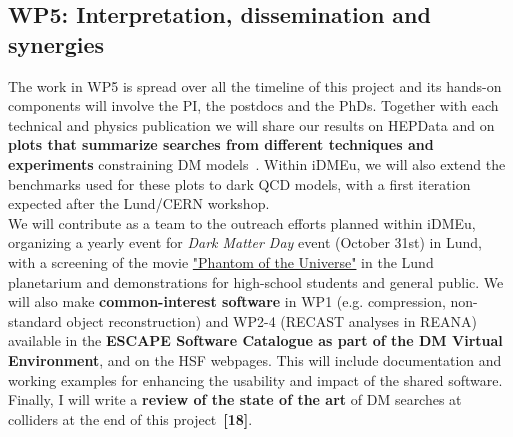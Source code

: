 \subsection{WP5: Interpretation, dissemination and synergies}

The work in WP5 is spread over all the timeline of this project and its hands-on components will involve the PI, the postdocs and the PhDs.
Together with each technical and physics publication we will share our results on HEPData and on \textbf{plots that summarize searches from different techniques and experiments} constraining DM models~\cite{ATLASSummary}. 
Within iDMEu, we will also extend the benchmarks used for these plots to dark QCD models, with a first iteration expected after the Lund/CERN workshop. \\
We will contribute as a team to the outreach efforts planned within iDMEu, organizing a yearly event for \textit{Dark Matter Day} event (October 31st) in Lund, with a screening of the movie \href{http://phantomoftheuniverse.com}{"Phantom of the Universe"} in the Lund planetarium and demonstrations for high-school students and general public. 
We will also make \textbf{common-interest software} in WP1 (e.g. compression, non-standard object reconstruction) and WP2-4 (RECAST analyses in REANA) available in the \textbf{ESCAPE Software Catalogue as part of the DM Virtual Environment}, and on the HSF webpages. 
This will include documentation and working examples for enhancing the usability and impact of the shared software. \\
Finally, I will write a \textbf{review of the state of the art} of DM searches at colliders at the end of this project~\textbf{[18]}. 




